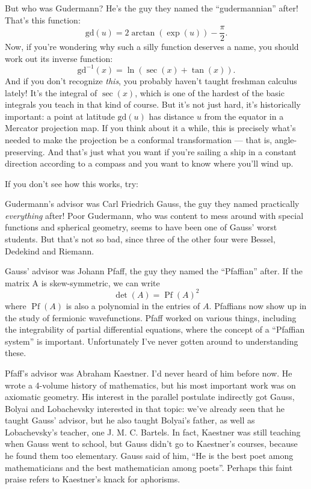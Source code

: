 \documentclass{article}
\def\tightlist{}
\renewcommand{\texttt}[1]{%
  \begingroup
  \ttfamily
  \begingroup\lccode`~=`/\lowercase{\endgroup\def~}{/\discretionary{}{}{}}%
  \begingroup\lccode`~=`[\lowercase{\endgroup\def~}{[\discretionary{}{}{}}%
  \begingroup\lccode`~=`.\lowercase{\endgroup\def~}{.\discretionary{}{}{}}%
  \catcode`/=\active\catcode`[=\active\catcode`.=\active
  \scantokens{#1\noexpand}%
  \endgroup
}
\begin{document}
But who was Gudermann? He's the guy they named the ``gudermannian''
after! That's this function:
\[\mathrm{gd}(u) = 2 \arctan(\exp(u)) - \frac\pi2.\] Now, if you're
wondering why such a silly function deserves a name, you should work out
its inverse function: \[\mathrm{gd}^{-1}(x) = \ln(\sec(x) + \tan(x)).\]
And if you don't recognize \emph{this}, you probably haven't taught
freshman calculus lately! It's the integral of \(\sec(x)\), which is one
of the hardest of the basic integrals you teach in that kind of course.
But it's not just hard, it's historically important: a point at latitude
\(\mathrm{gd}(u)\) has distance \(u\) from the equator in a Mercator
projection map. If you think about it a while, this is precisely what's
needed to make the projection be a conformal transformation --- that is,
angle-preserving. And that's just what you want if you're sailing a ship
in a constant direction according to a compass and you want to know
where you'll wind up.

If you don't see how this works, try:


Gudermann's advisor was Carl Friedrich Gauss, the guy they named
practically \emph{everything} after! Poor Gudermann, who was content to
mess around with special functions and spherical geometry, seems to have
been one of Gauss' worst students. But that's not so bad, since three of
the other four were Bessel, Dedekind and Riemann.

Gauss' advisor was Johann Pfaff, the guy they named the ``Pfaffian''
after. If the matrix A is skew-symmetric, we can write
\[\det(A) = \operatorname{Pf}(A)^2\] where \(\operatorname{Pf}(A)\) is
also a polynomial in the entries of \(A\). Pfaffians now show up in the
study of fermionic wavefunctions. Pfaff worked on various things,
including the integrability of partial differential equations, where the
concept of a ``Pfaffian system'' is important. Unfortunately I've never
gotten around to understanding these.

Pfaff's advisor was Abraham Kaestner. I'd never heard of him before now.
He wrote a 4-volume history of mathematics, but his most important work
was on axiomatic geometry. His interest in the parallel postulate
indirectly got Gauss, Bolyai and Lobachevsky interested in that topic:
we've already seen that he taught Gauss' advisor, but he also taught
Bolyai's father, as well as Lobachevsky's teacher, one J. M. C. Bartels.
In fact, Kaestner was still teaching when Gauss went to school, but
Gauss didn't go to Kaestner's courses, because he found them too
elementary. Gauss said of him, ``He is the best poet among
mathematicians and the best mathematician among poets''. Perhaps this
faint praise refers to Kaestner's knack for aphorisms.
\end{document}
